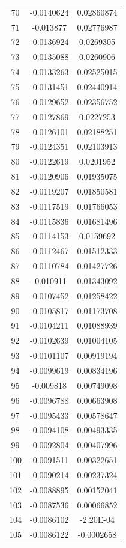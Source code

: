 \documentclass[a4paper, 11pt, oneside]{report}
\begin{document}
{\begin{longtable}{|c|c|c|}
70  & -0.0140624 & 0.02860874 \\
71  & -0.013877  & 0.02776987 \\
72  & -0.0136924 & 0.0269305  \\
73  & -0.0135088 & 0.0260906  \\
74  & -0.0133263 & 0.02525015 \\
75  & -0.0131451 & 0.02440914 \\
76  & -0.0129652 & 0.02356752 \\
77  & -0.0127869 & 0.0227253  \\
78  & -0.0126101 & 0.02188251 \\
79  & -0.0124351 & 0.02103913 \\
80  & -0.0122619 & 0.0201952  \\
81  & -0.0120906 & 0.01935075 \\
82  & -0.0119207 & 0.01850581 \\
83  & -0.0117519 & 0.01766053 \\
84  & -0.0115836 & 0.01681496 \\
85  & -0.0114153 & 0.0159692  \\
86  & -0.0112467 & 0.01512333 \\
87  & -0.0110784 & 0.01427726 \\
88  & -0.010911  & 0.01343092 \\
89  & -0.0107452 & 0.01258422 \\
90  & -0.0105817 & 0.01173708 \\
91  & -0.0104211 & 0.01088939 \\
92  & -0.0102639 & 0.01004105 \\
93  & -0.0101107 & 0.00919194 \\
94  & -0.0099619 & 0.00834196 \\
95  & -0.009818  & 0.00749098 \\
96  & -0.0096788 & 0.00663908 \\
97  & -0.0095433 & 0.00578647 \\
98  & -0.0094108 & 0.00493335 \\
99  & -0.0092804 & 0.00407996 \\
100 & -0.0091511 & 0.00322651 \\
101 & -0.0090214 & 0.00237324 \\
102 & -0.0088895 & 0.00152041 \\
103 & -0.0087536 & 0.00066852 \\
104 & -0.0086102 & -2.20E-04  \\
105 & -0.0086122 & -0.0002658 \\

\end{longtable}}
\end{document}
